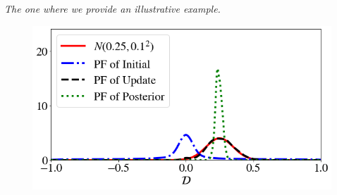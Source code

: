 \begin{frame}{\it The one where we provide an illustrative example.}
\begin{figure}
{{   \includegraphics[width=0.55\linewidth]{figures/bip-vs-sip-pf-20.png}
	 }}
 \label{fig:bayes-comparison-convergence}
\end{figure}


\end{frame}
